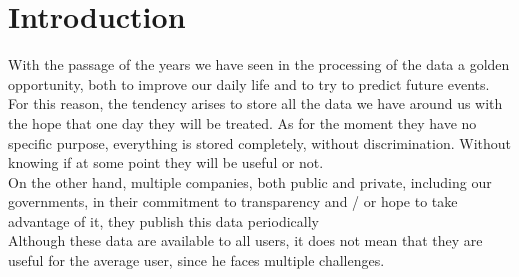 \newpage
\section{Introduction}

With the passage of the years we have seen in the processing of the data a golden opportunity, 
both to improve our daily life and to try to predict
future events. For this reason, the tendency arises to store all the data we have
around us with the hope that one day they will be treated.
As for the moment they have no specific purpose, everything is stored completely, without discrimination.
Without knowing if at some point they will be useful or not. \\

On the other hand, multiple companies, both public and private, including our governments, 
in their commitment to transparency and / or hope to take advantage of it, they publish this data 
periodically \\

Although these data are available to all users, it does not mean that they are useful for the 
average user, since he faces multiple challenges. \\

